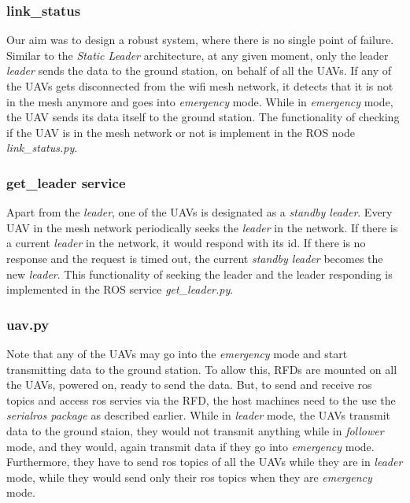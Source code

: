 \subsubsection{link\_status}
Our aim was to design a robust system, where there is no single point of failure. Similar to the \textit{Static Leader} architecture, at any given moment, only the leader \textit{leader} sends the data to the ground station, on behalf of all the UAVs. If any of the UAVs gets disconnected from the wifi mesh network, it detects that it is not in the mesh anymore and goes into \textit{emergency} mode. While in \textit{emergency} mode, the UAV sends its data itself to the ground station. The functionality of checking if the UAV is in the mesh network or not is implement in the ROS node \textit{link\_status.py}.

\subsubsection{get\_leader service}
Apart from the \textit{leader}, one of the UAVs is designated as a \textit{standby leader}. Every UAV in the mesh network periodically seeks the \textit{leader} in the network. If there is a current \textit{leader} in the network, it would respond with its id. If there is no response and the request is timed out, the current \textit{standby leader} becomes the new \textit{leader}. This functionality of seeking the leader and the leader responding is implemented in the ROS service \textit{get\_leader.py}.

\subsubsection{uav.py}
Note that any of the UAVs may go into the \textit{emergency} mode and start transmitting data to the ground station. To allow this, RFDs are mounted on all the UAVs, powered on, ready to send the data. But, to send and receive ros topics and access ros servies via the RFD, the host machines need to the use the \textit{serialros package} as described earlier. While in \textit{leader} mode, the UAVs transmit data to the ground staion, they would not transmit anything while in \textit{follower} mode, and they would, again transmit data if they go into \textit{emergency} mode. Furthermore, they have to send ros topics of all the UAVs while they are in \textit{leader} mode, while they would send only their ros topics when they are \textit{emergency} mode.

